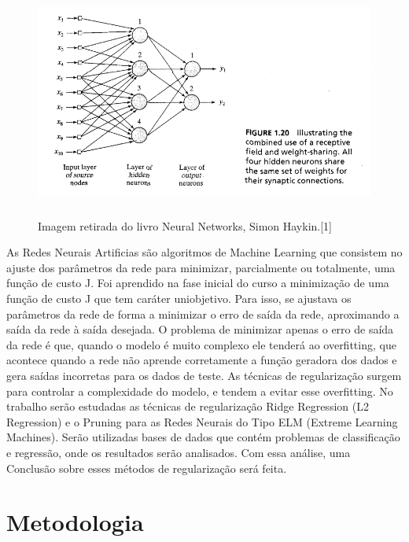 \documentclass{article}
\begin{document}
\begin{figure}[h]

    \centering
    \includegraphics[height=3in]{neural_net_pic.png}
    \caption{Imagem retirada do livro Neural Networks, Simon Haykin.[1]}
    \label{fig:example}

\end{figure}


\vspace{15pt}

As Redes Neurais Artificias são algoritmos de Machine Learning que consistem no ajuste dos parâmetros da rede para minimizar, parcialmente ou totalmente, uma função de custo J. Foi aprendido na fase inicial do curso a minimização de uma função de custo J que tem caráter uniobjetivo. Para isso, se ajustava os parâmetros da rede de forma a minimizar o erro de saída da rede, aproximando a saída da rede à saída desejada. O problema de minimizar apenas o erro de saída da rede é que, quando o modelo é muito complexo ele tenderá ao overfitting, que acontece quando a rede não aprende corretamente a função geradora dos dados e gera saídas incorretas para os dados de teste. As técnicas de regularização surgem para controlar a complexidade do modelo, e tendem a evitar esse overfitting. No trabalho serão estudadas as técnicas de regularização Ridge Regression (L2 Regression) e o Pruning para as Redes Neurais do Tipo ELM (Extreme Learning Machines). Serão utilizadas bases de dados que contém problemas de classificação e regressão, onde os resultados serão analisados. Com essa análise, uma Conclusão sobre esses métodos de regularização será feita.


\newpage


\section*{Metodologia}
\end{document}

